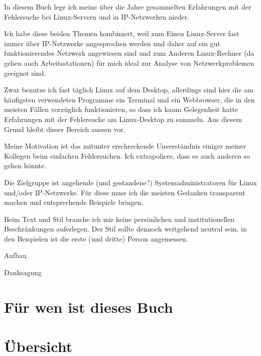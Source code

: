 \begin{normaltext}
  In diesem Buch lege ich meine über die Jahre gesammelten Erfahrungen mit
  der Fehlersuche bei Linux-Servern und in IP-Netzwerken nieder.

  Ich habe diese beiden Themen kombiniert, weil zum Einen Linux-Server fast
  immer über IP-Netzwerke angesprochen werden und daher auf ein gut
  funktionierendes Netzwerk angewiesen sind und zum Anderen Linux-Rechner
  (da gehen auch Arbeitsstationen) für mich ideal zur Analyse von
  Netzwerkproblemen geeignet sind.

  Zwar benutze ich fast täglich Linux auf dem Desktop, allerdings sind hier
  die am häufigsten verwendeten Programme ein Terminal und ein Webbrowser, die
  in den meisten Fällen vorzüglich funktionieren, so dass ich kaum Gelegenheit
  hatte Erfahrungen mit der Fehlersuche am Linux-Desktop zu sammeln. Aus
  diesem Grund bleibt dieser Bereich aussen vor.
\end{normaltext}
\begin{notes}
\item Meine Motivation ist das mitunter erschreckende Unverständnis einiger
  meiner Kollegen beim einfachen Fehlersuchen. Ich extrapoliere, dass es auch
  anderen so gehen könnte.
\item Die Zielgruppe ist angehende (und gestandene?) Systemadministratoren für
  Linux und/oder IP-Netzwerke. Für diese muss ich die meisten Gedanken
  transparent machen und entsprechende Beispiele bringen.
\item Beim Text und Stil brauche ich mir keine persönlichen und
  institutionellen Beschränkungen auferlegen. Der Stil sollte dennoch
  weitgehend neutral sein, in den Beispielen ist die erste (und dritte)
  Person angemessen.
\item Aufbau
\item Danksagung
\end{notes}

\section*{Für wen ist dieses Buch}
\label{sec:fuerwen}

\begin{normaltext}
\end{normaltext}

\section*{Übersicht}
\label{sec:ubersicht}

